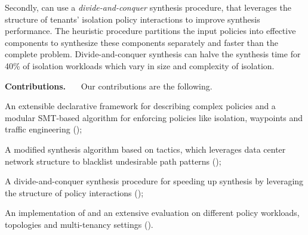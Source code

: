  Secondly, \Name can use a \emph{divide-and-conquer}
 synthesis
 procedure, that leverages the structure of tenants'
 isolation policy interactions to improve synthesis performance. The
 heuristic procedure partitions the input policies
  into effective components to synthesize these
 components separately and faster than the complete problem. 
 Divide-and-conquer synthesis can halve the
 synthesis time for 40\% of isolation workloads  
 which vary in size and complexity of isolation.


\noindent \textbf{Contributions.} \ \ \ Our contributions are the following.
\begin{compactitemize}
\item An extensible declarative framework for describing
  complex policies and a modular SMT-based algorithm for enforcing policies
  like isolation, waypoints and traffic engineering ();
\item A modified synthesis algorithm based on tactics, which leverages data center network structure
  to blacklist undesirable path patterns ();
\item A divide-and-conquer synthesis procedure for speeding up synthesis by leveraging the 
structure of policy interactions ();
\item An implementation of \Name and an extensive evaluation on different policy workloads, topologies and multi-tenancy settings ().
\end{compactitemize}

